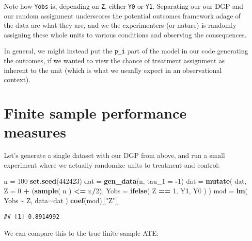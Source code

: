\documentclass[
]{book}
\newenvironment{Shaded}{\begin{snugshade}}{\end{snugshade}}
\newcommand{\AttributeTok}[1]{\textcolor[rgb]{0.13,0.29,0.53}{#1}}
\newcommand{\DecValTok}[1]{\textcolor[rgb]{0.00,0.00,0.81}{#1}}
\newcommand{\FunctionTok}[1]{\textcolor[rgb]{0.13,0.29,0.53}{\textbf{#1}}}
\newcommand{\NormalTok}[1]{#1}
\newcommand{\OtherTok}[1]{\textcolor[rgb]{0.56,0.35,0.01}{#1}}
\newcommand{\SpecialCharTok}[1]{\textcolor[rgb]{0.81,0.36,0.00}{\textbf{#1}}}
\newcommand{\StringTok}[1]{\textcolor[rgb]{0.31,0.60,0.02}{#1}}
\begin{document}
Note how \texttt{Yobs} is, depending on \texttt{Z}, either \texttt{Y0} or \texttt{Y1}.
Separating our our DGP and our random assignment underscores the potential outcomes framework adage of the data are what they are, and we the experimenters (or nature) is randomly assigning these whole units to various conditions and observing the consequences.

In general, we might instead put the \texttt{p\_i} part of the model in our code generating the outcomes, if we wanted to view the chance of treatment assignment as inherent to the unit (which is what we usually expect in an observational context).

\section{Finite sample performance measures}\label{finite-sample-performance-measures}

Let's generate a single dataset with our DGP from above, and run a small experiment where we actually randomize units to treatment and control:

\begin{Shaded}
\begin{Highlighting}[]
\NormalTok{n }\OtherTok{=} \DecValTok{100}
\FunctionTok{set.seed}\NormalTok{(}\DecValTok{442423}\NormalTok{)}
\NormalTok{dat }\OtherTok{=} \FunctionTok{gen\_data}\NormalTok{(n, }\AttributeTok{tau\_1 =} \SpecialCharTok{{-}}\DecValTok{1}\NormalTok{)}
\NormalTok{dat }\OtherTok{=} \FunctionTok{mutate}\NormalTok{( dat,}
              \AttributeTok{Z =} \DecValTok{0} \SpecialCharTok{+}\NormalTok{ (}\FunctionTok{sample}\NormalTok{( n ) }\SpecialCharTok{\textless{}=}\NormalTok{ n}\SpecialCharTok{/}\DecValTok{2}\NormalTok{),}
              \AttributeTok{Yobs =} \FunctionTok{ifelse}\NormalTok{( Z }\SpecialCharTok{==} \DecValTok{1}\NormalTok{, Y1, Y0 ) )}
\NormalTok{mod }\OtherTok{=} \FunctionTok{lm}\NormalTok{( Yobs }\SpecialCharTok{\textasciitilde{}}\NormalTok{ Z, }\AttributeTok{data=}\NormalTok{dat )}
\FunctionTok{coef}\NormalTok{(mod)[[}\StringTok{"Z"}\NormalTok{]]}
\end{Highlighting}
\end{Shaded}

\begin{verbatim}
## [1] 0.8914992
\end{verbatim}

We can compare this to the true finite-sample ATE:

\begin{Shaded}
\end{Shaded}
\end{document}
